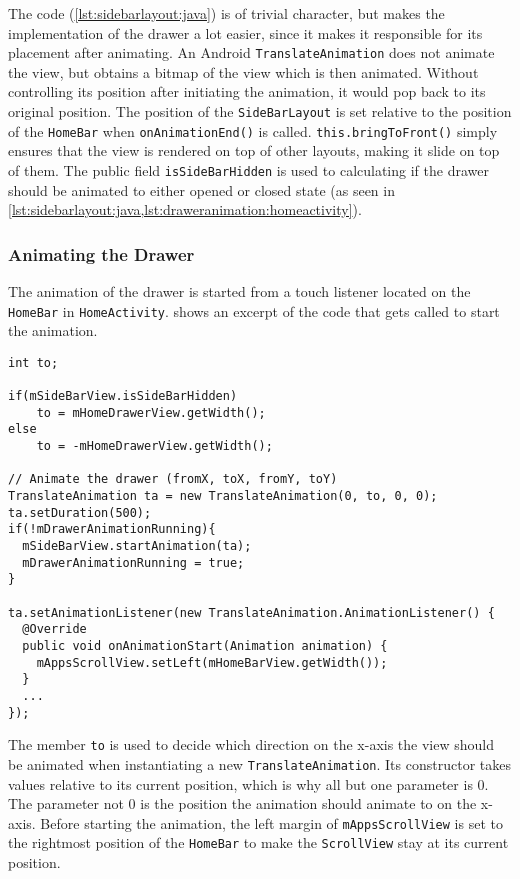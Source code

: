 The code (\cref{lst:sidebarlayout:java}) is of trivial character, but makes the implementation of the drawer a lot easier, since it makes it responsible for its placement after animating.
An Android \lstinline|TranslateAnimation| does not animate the view, but obtains a bitmap of the view which is then animated.
Without controlling its position after initiating the animation, it would pop back to its original position.
The position of the \lstinline|SideBarLayout| is set relative to the position of the \lstinline|HomeBar| when \lstinline|onAnimationEnd()| is called.
\lstinline|this.bringToFront()| simply ensures that the view is rendered on top of other layouts, making it slide on top of them.
The public field \lstinline|isSideBarHidden| is used to calculating if the drawer should be animated to either opened or closed state (as seen in \cref{lst:sidebarlayout:java,lst:draweranimation:homeactivity}).

\subsubsection{Animating the Drawer}
The animation of the drawer is started from a touch listener located on the \lstinline|HomeBar| in \lstinline|HomeActivity|.
 shows an excerpt of the code that gets called to start the animation.

\begin{lstlisting}[caption={Excerpt of \lstinline|placeDrawer()| method from the home activity.},label={lst:draweranimation:homeactivity}]
int to;

if(mSideBarView.isSideBarHidden)
    to = mHomeDrawerView.getWidth();
else
    to = -mHomeDrawerView.getWidth();

// Animate the drawer (fromX, toX, fromY, toY)
TranslateAnimation ta = new TranslateAnimation(0, to, 0, 0);
ta.setDuration(500);
if(!mDrawerAnimationRunning){
  mSideBarView.startAnimation(ta);
  mDrawerAnimationRunning = true;
}

ta.setAnimationListener(new TranslateAnimation.AnimationListener() {
  @Override
  public void onAnimationStart(Animation animation) {
    mAppsScrollView.setLeft(mHomeBarView.getWidth());
  }
  ...
});
\end{lstlisting}

The member \lstinline|to| is used to decide which direction on the x-axis the view should be animated when instantiating a new \lstinline|TranslateAnimation|.
Its constructor takes values relative to its current position, which is why all but one parameter is 0.
The parameter not 0 is the position the animation should animate to on the x-axis.
Before starting the animation, the left margin of \lstinline|mAppsScrollView| is set to the rightmost position of the \lstinline|HomeBar| to make the \lstinline|ScrollView| stay at its current position.